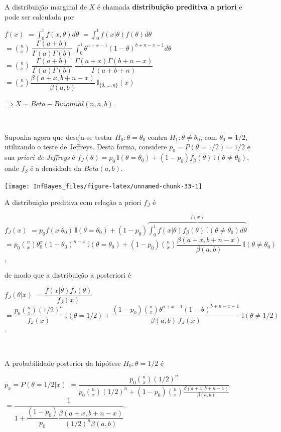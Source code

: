 \documentclass[
]{book}
\begin{document}
A distribuição marginal de \(X\) é chamada \textbf{distribuição preditiva a priori} e pode ser calculada por

\(f(x)\) \(=\displaystyle \int_0^1 f(x,\theta)d\theta\)
\(=\displaystyle \int_0^1 f(x|\theta)f(\theta)d\theta\)
\(=\displaystyle \binom{n}{x}~\dfrac{\Gamma(a+b)}{\Gamma(a)\Gamma(b)}~\int_0^1 \theta^{a+x-1}(1-\theta)^{b+n-x-1}d\theta\)
\(=\displaystyle \binom{n}{x}~\dfrac{\Gamma(a+b)}{\Gamma(a)\Gamma(b)}~\dfrac{\Gamma(a+x)\Gamma(b+n-x)}{\Gamma(a+b+n)}\)
\(=\displaystyle \binom{n}{x} \dfrac{\beta(a+x,b+n-x)}{\beta(a,b)}~\mathbb{I}_{\{0,\ldots,n\}}(x)\)

\(\Longrightarrow X \sim Beta-Binomial(n,a,b)\).

\(~\)

Suponha agora que deseja-se testar \(H_0: \theta=\theta_0\) contra \(H_1:\theta\neq \theta_0\), com \(\theta_0=1/2\), utilizando o teste de Jeffreys. Desta forma, considere \(p_0=P(\theta=1/2)=1/2\) e sua \emph{priori de Jeffreys} é \(f_J(\theta)=p_0~\mathbb{I}(\theta=\theta_0) +(1-p_0)f_\beta(\theta)~\mathbb{I}(\theta\neq\theta_0)\), onde \(f_\beta\) é a densidade da \(Beta(a,b)\).

\begin{center}\texttt{[image: InfBayes\_files/figure-latex/unnamed-chunk-33-1]} \end{center}

A distribuição preditiva com relação a priori \(f_J\) é

\(f_J(x)\) \(=\displaystyle p_0f(x|\theta_0)~\mathbb{I}(\theta=\theta_0)+ (1-p_0)\overbrace{\int_0^1f(x|\theta)f_\beta(\theta)~\mathbb{I}(\theta\neq\theta_0)d\theta}^{f(x)}\)
\(=\displaystyle p_0\binom{n}{x}{\theta}_0^x(1-\theta_0)^{n-x}~\mathbb{I}(\theta=\theta_0) + (1-p_0)\binom{n}{x}\dfrac{\beta(a+x,b+n-x)}{\beta(a,b)}~\mathbb{I}(\theta\neq\theta_0)\),

de modo que a distribuição a posteriori é

\(f_J(\theta| x)\) \(= \dfrac{f( x|\theta)f_J(\theta)}{f_J(x)}\)
\(= \dfrac{p_0\binom{n}{x} (1/2)^n}{f_J(x)}~\mathbb{I}(\theta=1/2) +\dfrac{(1-p_0)\binom{n}{x}\theta^{a+x-1}(1-\theta)^{b+n-x-1}}{\beta(a,b)~f_J(x)}~\mathbb I(\theta\neq 1/2)\).

\(~\)

A probabilidade posterior da hipótese \(H_0:\theta=1/2\) é

\(p_x=P(\theta=1/2|x)\) \(=\dfrac{p_0\binom{n}{x}(1/2)^n}{p_0\binom{n}{x}(1/2)^n+(1-p_0)\binom{n}{x}\frac{\beta(a+x,b+n-x)}{\beta(a,b)}}\) \(=\dfrac{1}{1+\dfrac{(1-p_0)}{p_0}\dfrac{\beta(a+x,b+n-x)}{(1/2)^n\beta(a,b)}}\).
\end{document}
